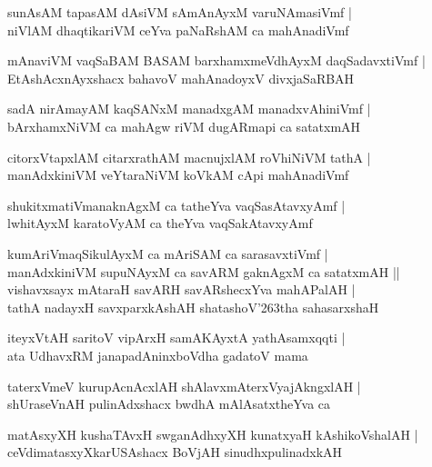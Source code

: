 \documentclass[twoside,12pt,openright]{book}
\def\S{\char'263}
\newcounter{shloka}[chapter]
\begin{document}
\begin{shloka}
sunAsAM tapasAM dAsiVM sAmAnAyxM varuNAmasiVmf |\\
niVlAM dhaqtikariVM ceYva paNaRshAM ca mahAnadiVmf
\end{shloka}

\begin{shloka}
mAnaviVM vaqSaBAM BASAM barxhamxmeVdhAyxM daqSadavxtiVmf |\\
EtAshAcxnAyxshacx bahavoV mahAnadoyxV divxjaSaRBAH
\end{shloka}

\begin{shloka}
sadA nirAmayAM kaqSANxM manadxgAM manadxvAhiniVmf |\\
bArxhamxNiVM ca mahAgw riVM dugARmapi ca satatxmAH 
\end{shloka}

\begin{shloka}
citorxVtapxlAM citarxrathAM macnujxlAM roVhiNiVM tathA |\\
manAdxkiniVM veYtaraNiVM koVkAM cApi mahAnadiVmf
\end{shloka}

\begin{shloka}
shukitxmatiVmanaknAgxM ca tatheYva vaqSasAtavxyAmf |\\
lwhitAyxM karatoVyAM ca theYva vaqSakAtavxyAmf
\end{shloka}

\begin{shloka}
kumAriVmaqSikulAyxM ca mAriSAM ca sarasavxtiVmf |\\
manAdxkiniVM supuNAyxM ca savARM gaknAgxM ca satatxmAH ||\\
vishavxsayx mAtaraH savARH savARshecxYva mahAPalAH |\\
tathA nadayxH savxparxkAshAH shatashoV\S tha sahasarxshaH
\end{shloka}

\begin{shloka}
iteyxVtAH saritoV vipArxH samAKAyxtA yathAsamxqqti |\\
ata UdhavxRM janapadAninxboVdha gadatoV mama
\end{shloka}

\begin{shloka}
taterxVmeV kurupAcnAcxlAH shAlavxmAterxVyajAkngxlAH |\\
shUraseVnAH pulinAdxshacx bwdhA mAlAsatxtheYva ca
\end{shloka}

\begin{shloka}
matAsxyXH kushaTAvxH swganAdhxyXH kunatxyaH kAshikoVshalAH |\\
ceVdimatasxyXkarUSAshacx BoVjAH sinudhxpulinadxkAH
\end{shloka}
\end{document}
